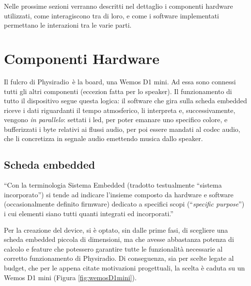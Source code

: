\documentclass[12pt,a4paper]{report}
\newcommand{\physiradio}{Physiradio} %
\begin{document}
Nelle prossime sezioni verranno descritti nel dettaglio i componenti hardware utilizzati, come interagiscono tra di loro, e come i software implementati permettano le interazioni tra le varie parti. 

\section{Componenti Hardware}

Il fulcro di \physiradio\ è la board, una Wemos D1 mini. Ad essa sono connessi tutti gli altri componenti (eccezion fatta per lo speaker). %
Il funzionamento di tutto il dispositivo segue questa logica: il software che gira sulla scheda embedded riceve i dati riguardanti il tempo atmosferico, li interpreta e, successivamente, vengono \textit{in parallelo}: settati i led, per poter emanare uno specifico colore, e bufferizzati i byte relativi ai flussi audio, per poi essere mandati al codec audio, che li concretizza in segnale audio emettendo musica dallo speaker.

\subsection{Scheda embedded}\label{sec:wemos} %

``Con la terminologia Sistema Embedded (tradotto testualmente ``sistema incorporato'') si tende ad indicare l’insieme composto da hardware e software (occasionalmente definito firmware) dedicato a specifici scopi (``\textit{specific purpose}'') i cui elementi siano tutti quanti integrati ed incorporati.'' \cite{sistemiembedded}

Per la creazione del device, si è optato, sin dalle prime fasi, di scegliere una scheda embedded piccola di dimensioni, ma che avesse abbastanza potenza di calcolo e feature che potessero garantire tutte le funzionalità necessarie al corretto funzionamento di \physiradio.
Di conseguenza, sia per scelte legate al budget, che per le appena citate motivazioni progettuali, la scelta è caduta su un Wemos D1 mini (Figura \ref{fig:wemosD1mini}).
\end{document}
